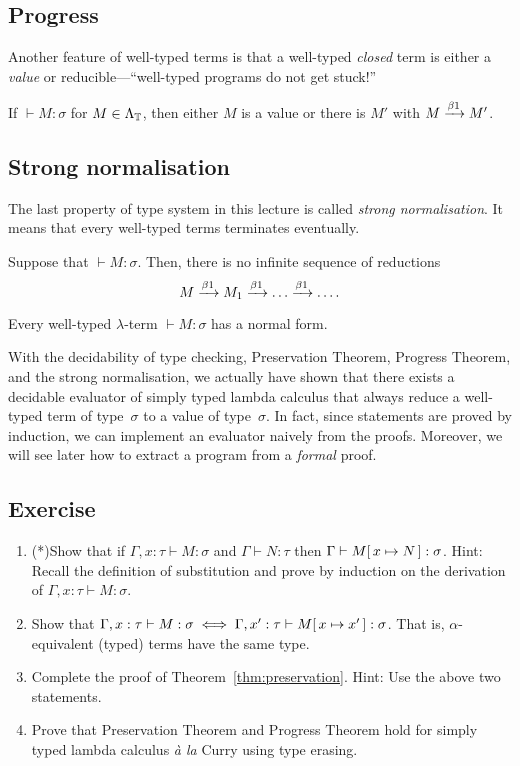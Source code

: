 \subsection{Progress}
Another feature of well-typed terms is that a well-typed \emph{closed} term is
either a \emph{value} or reducible---``well-typed programs do not get stuck!''

\begin{theorem}
  If ${}\vdash M : \sigma$ for $M \in \Lambda_{\mathbb{T}}$, then either $M$ is a value or
  there is $M'$ with $M \xrightarrow{\beta1} M'$.
\end{theorem}

\subsection{Strong normalisation}
The last property of type system in this lecture is called \emph{strong
  normalisation}. It means that every well-typed terms terminates eventually. 
\begin{theorem}
  Suppose that ${}\vdash M : \sigma$. Then,
  there is no infinite sequence of reductions
  \[
    M \xrightarrow{\beta1} M_1 \xrightarrow{\beta1} \dots \xrightarrow{\beta1} \dots.
  \]
\end{theorem}
\begin{corollary}
  Every well-typed $\lambda$-term ${}\vdash M:\sigma$ has a normal form.
\end{corollary}
With the decidability of type checking, Preservation Theorem, Progress Theorem,
and the strong normalisation, we actually have shown that there exists a
decidable evaluator of simply typed lambda calculus that always reduce a
well-typed term of type~$\sigma$ to a value of type~$\sigma$. In fact, since
statements are proved by induction, we can implement an evaluator naively from
the proofs. Moreover, we will see later how to extract a program from a
\emph{formal} proof.
\subsection*{Exercise}
\begin{enumerate}
  \item (*)Show that if $\Gamma, x : \tau \vdash M : \sigma$
    and $\Gamma \vdash N : \tau$ then $\Gamma \vdash M[\,x\mapsto N\,] : \sigma$.
    Hint: Recall the definition of substitution and prove by induction
    on the derivation of $\Gamma, x:\tau\vdash M : \sigma$.
  \item Show that $\Gamma, x : \tau \vdash M :\sigma
    \iff \Gamma, x' : \tau \vdash M[\,x\mapsto x'\,] : \sigma$. That is,
    $\alpha$-equivalent (typed) terms have the same type.
  \item Complete the proof of Theorem~\ref{thm:preservation}. Hint: Use the
    above two statements.
  \item Prove that Preservation Theorem and Progress Theorem hold for
    simply typed lambda calculus \textit{\`a la} Curry using type erasing.
\end{enumerate}
